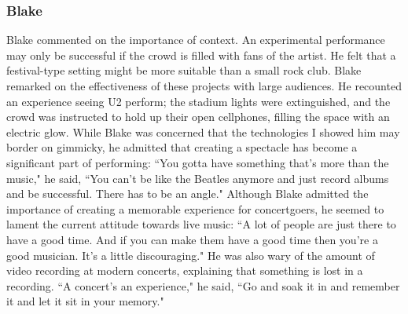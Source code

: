 \subsubsection{Blake}
Blake commented on the importance of context. An experimental performance may only be successful if the crowd is filled with fans of the artist. He felt that a festival-type setting might be more suitable than a small rock club. Blake remarked on the effectiveness of these projects with large audiences. He recounted an experience seeing U2 perform; the stadium lights were extinguished, and the crowd was instructed to hold up their open cellphones, filling the space with an electric glow. While Blake was concerned that the technologies I showed him may border on gimmicky, he admitted that creating a spectacle has become a significant part of performing: ``You gotta have something that's more than the music," he said, ``You can't be like the Beatles anymore and just record albums and be successful. There has to be an angle." Although Blake admitted the importance of creating a memorable experience for concertgoers, he seemed to lament the current attitude towards live music: ``A lot of people are just there to have a good time. And if you can make them have a good time then you're a good musician. It's a little discouraging." He was also wary of the amount of video recording at modern concerts, explaining that something is lost in a recording. ``A concert's an experience," he said, ``Go and soak it in and remember it and let it sit in your memory."


